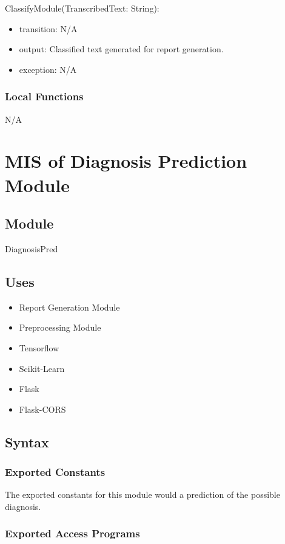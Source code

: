 \documentclass[12pt, titlepage]{article}
\begin{document}
\noindent ClassifyModule(TranscribedText: String):
\begin{itemize}
\item transition: N/A
\item output: Classified text generated for report generation. 
\item exception: N/A 
\end{itemize}

\subsubsection{Local Functions}

N/A

\newpage

\section{MIS of Diagnosis Prediction Module} \label{diag_pred_mod}

\subsection{Module}

DiagnosisPred

\subsection{Uses}
\begin{itemize}
  \item Report Generation Module
  \item Preprocessing Module
  \item Tensorflow
  \item Scikit-Learn
  \item Flask
  \item Flask-CORS
\end{itemize}

\subsection{Syntax}

\subsubsection{Exported Constants}
The exported constants for this module would a prediction of the possible diagnosis.

\subsubsection{Exported Access Programs}
\end{document}

